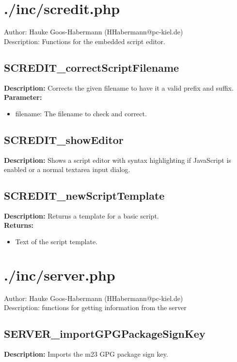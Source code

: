 \newpage\section{./inc/scredit.php}
 Author: Hauke Goos-Habermann (HHabermann@pc-kiel.de)\\
 Description: Functions for the embedded script editor.\\

\subsection{SCREDIT\_correctScriptFilename}
\textbf{Description:} Corrects the given filename to have it a valid prefix and suffix.\\
\textbf{Parameter:}
\begin{itemize}
\item filename: The filename to check and correct.
\end{itemize}

\subsection{SCREDIT\_showEditor}
\textbf{Description:} Shows a script editor with syntax highlighting if JavaScript is enabled or a normal textarea input dialog.\\

\subsection{SCREDIT\_newScriptTemplate}
\textbf{Description:} Returns a template for a basic script.\\
\textbf{Returns:}
\begin{itemize}
\item Text of the script template.
\end{itemize}

\newpage\section{./inc/server.php}
 Author: Hauke Goos-Habermann (HHabermann@pc-kiel.de)\\
 Description: functions for getting information from the server\\

\subsection{SERVER\_importGPGPackageSignKey}
\textbf{Description:} Imports the m23 GPG package sign key.\\

